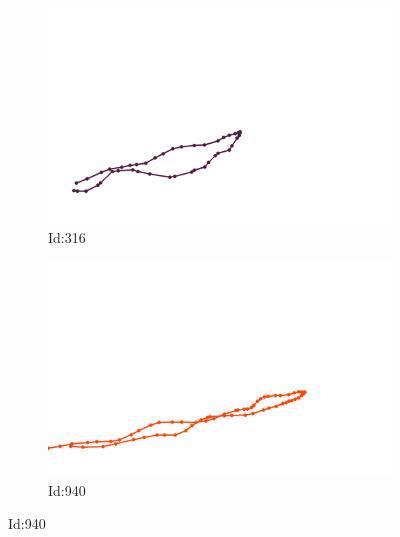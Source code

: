 \documentclass[12pt,twoside]{report}
\begin{document}
\begin{figure}
\centering
\begin{subfigure}[b]{0.20\textwidth}
\centering
\includegraphics[width=\textwidth]{../../trajectories/316.png}
\caption{Id:316}
\end{subfigure}
\begin{subfigure}[b]{0.20\textwidth}
\centering
\includegraphics[width=\textwidth]{../../trajectories/940.png}
\caption{Id:940}
\end{subfigure}
\end{figure}
\end{document}
